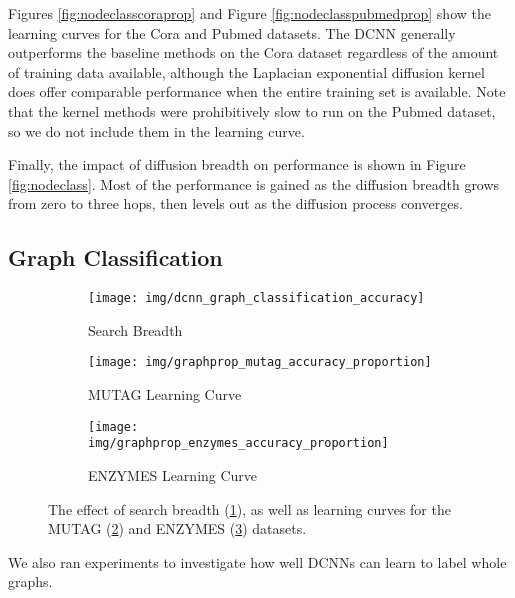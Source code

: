 \documentclass{article}
\newcommand{\subfigwidth}{0.3\textwidth}
\begin{document}
Figures \ref{fig:nodeclasscoraprop} and Figure \ref{fig:nodeclasspubmedprop} show the learning curves for the Cora and Pubmed datasets.  The DCNN generally outperforms the baseline methods on the Cora dataset regardless of the amount of training data available, although the Laplacian exponential diffusion kernel does offer comparable performance when the entire training set is available.  Note that the kernel methods were prohibitively slow to run on the Pubmed dataset, so we do not include them in the learning curve.

Finally, the impact of diffusion breadth on performance is shown in Figure \ref{fig:nodeclass}.  Most of the performance is gained as the diffusion breadth grows from zero to three hops, then levels out as the diffusion process converges.

\subsection{Graph Classification}
\begin{figure}[t]
    \centering
    \begin{subfigure}[t]{\subfigwidth}
        \centering
        \texttt{[image: img/dcnn\_graph\_classification\_accuracy]}
        \caption{Search Breadth}
        \label{fig:graphclasssearch}
    \end{subfigure}
    \begin{subfigure}[t]{\subfigwidth}
        \centering
        \texttt{[image: img/graphprop\_mutag\_accuracy\_proportion]}
        \caption{MUTAG Learning Curve}
        \label{fig:graphclassmutag}
    \end{subfigure}
    \begin{subfigure}[t]{\subfigwidth}
        \centering
        \texttt{[image: img/graphprop\_enzymes\_accuracy\_proportion]}
        \caption{ENZYMES Learning Curve}
        \label{fig:graphclassenzymes}
    \end{subfigure}
    \caption{The effect of search breadth (\ref{fig:graphclasssearch}), as well as learning curves for the MUTAG (\ref{fig:graphclassmutag}) and ENZYMES (\ref{fig:graphclassenzymes}) datasets.}
    \label{fig:graphclass}
\end{figure}

We also ran experiments to investigate how well DCNNs can learn to label whole graphs.
\end{document}
